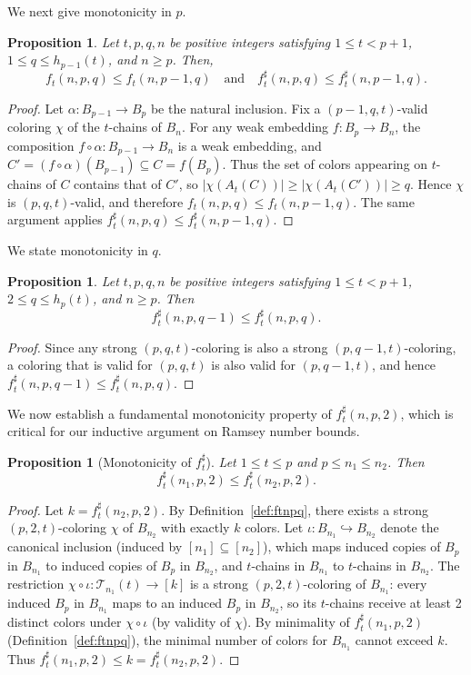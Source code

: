 \documentclass[twoside,12pt]{article}
\newtheorem{proposition}[theorem]{Proposition}
\begin{document}
We next give monotonicity in $p$.
\begin{proposition}\label{prop-ft-p-ineq}
Let $t, p, q, n$ be positive integers satisfying $1 \leq t < p+1$, $1 \leq q \leq h_{p-1}(t)$, and $n \geq p$. Then,
\[ f_t(n, p, q) \leq f_t(n, p-1, q) \quad \text{and} \quad f_t^\sharp(n, p, q) \leq f_t^\sharp(n, p-1, q). \]
\end{proposition}
\begin{proof}
Let $\alpha:B_{p-1}\rightarrow B_p$ be the natural inclusion.
Fix a $(p\!-\!1,q,t)$-valid coloring $\chi$ of the $t$-chains of $B_n$.
For any weak embedding $f:B_p\to B_n$, the composition $f\circ\alpha:B_{p-1}\to B_n$ is a weak embedding, and
$C'=(f\circ\alpha)(B_{p-1})\subseteq C=f(B_p)$.
Thus the set of colors appearing on $t$-chains of $C$ contains that of $C'$, so
$|\chi(A_t(C))|\ge |\chi(A_t(C'))|\ge q$.
Hence $\chi$ is $(p,q,t)$-valid, and therefore $f_t(n,p,q)\le f_t(n,p-1,q)$.
The same argument applies $f_t^\sharp(n,p,q)\le f_t^\sharp(n,p-1,q)$.
\end{proof}

We state monotonicity in $q$.
\begin{proposition}\label{prop-ft-q-ineq}
Let $t, p, q, n$ be positive integers satisfying
$1 \leq t < p+1$, $2 \leq q \leq h_p(t)$, and
$n \geq p$. Then
\[
f_t^\sharp(n, p, q-1) \leq f_t^\sharp(n, p, q).
\]
\end{proposition}

\begin{proof}
Since any strong $(p,q,t)$-coloring is also a strong $(p,q-1,t)$-coloring, a coloring that is valid for $(p,q,t)$ is also valid for $(p,q-1,t)$, and hence
$f_t^\sharp(n,p,q-1) \le f_t^\sharp(n,p,q)$.
\end{proof}

We now establish a fundamental monotonicity property of \(f_t^\sharp(n,p,2)\), which is critical for our inductive argument on Ramsey number bounds.
\begin{proposition}[Monotonicity of \(f_t^\sharp\)]\label{prop-ftsharp-n-ineq}
Let \(1 \leq t \leq p\) and \(p \leq n_1 \leq n_2\). Then
\[
f_t^\sharp(n_1, p, 2) \leq f_t^\sharp(n_2, p, 2).
\]
\end{proposition}
\begin{proof}
Let \(k = f_t^\sharp(n_2, p, 2)\). By Definition~\ref{def:ftnpq}, there exists a strong \((p,2,t)\)-coloring \(\chi\) of \(B_{n_2}\) with exactly \(k\) colors. Let \(\iota: B_{n_1} \hookrightarrow B_{n_2}\) denote the canonical inclusion (induced by \([n_1] \subseteq [n_2]\)), which maps induced copies of \(B_p\) in \(B_{n_1}\) to induced copies of \(B_p\) in \(B_{n_2}\), and \(t\)-chains in \(B_{n_1}\) to \(t\)-chains in \(B_{n_2}\).
The restriction \(\chi \circ \iota: \mathcal{T}_{n_1}(t) \to [k]\) is a strong \((p,2,t)\)-coloring of \(B_{n_1}\): every induced \(B_p\) in \(B_{n_1}\) maps to an induced \(B_p\) in \(B_{n_2}\), so its \(t\)-chains receive at least 2 distinct colors under \(\chi \circ \iota\) (by validity of \(\chi\)).
By minimality of \(f_t^\sharp(n_1, p, 2)\) (Definition~\ref{def:ftnpq}), the minimal number of colors for \(B_{n_1}\) cannot exceed \(k\). Thus \(f_t^\sharp(n_1, p, 2) \leq k = f_t^\sharp(n_2, p, 2)\).
\end{proof}
\end{document}
